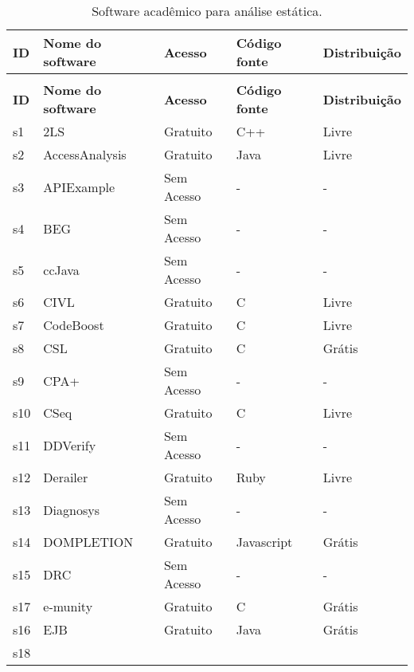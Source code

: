 \begin{longtable}{l l l l l}
\caption{Software acadêmico para análise estática.}
\label{software-table} \\
  \hhline{l l l l l |}
  \hline
  \endfirsthead
  \hhline{l l l l l |}
  \hline
  \textbf{ID} & \textbf{Nome do software} & \textbf{Acesso} & \textbf{Código fonte} & \textbf{Distribuição} \\
  \hline
  \hhline{l l l l l |}
  \endhead
  \hhline{-----}
  \multicolumn{5}{c}{continua na próxima página} \\
  \hhline{-----} \endfoot
  \endlastfoot
  \textbf{ID} & \textbf{Nome do software} & \textbf{Acesso} & \textbf{Código fonte} & \textbf{Distribuição} \\
  \hline
    s1 &
      2LS &
      Gratuito &
      C++ &
      Livre \\
    s2 &
      AccessAnalysis &
      Gratuito &
      Java &
      Livre \\
    s3 &
      APIExample &
      Sem Acesso &
      - &
      - \\
    s4 &
      BEG &
      Sem Acesso &
      - &
      - \\
    s5 &
      ccJava &
      Sem Acesso &
      - &
      - \\
    s6 &
      CIVL &
      Gratuito &
      C &
      Livre \\
    s7 &
      CodeBoost &
      Gratuito &
      C &
      Livre \\
    s8 &
      CSL &
      Gratuito &
      C &
      Grátis \\
    s9 &
      CPA+ &
      Sem Acesso &
      - &
      - \\
    s10 &
      CSeq &
      Gratuito &
      C &
      Livre \\
    s11 &
      DDVerify &
      Sem Acesso &
      - &
      - \\
    s12 &
      Derailer &
      Gratuito &
      Ruby &
      Livre \\
    s13 &
      Diagnosys &
      Sem Acesso &
      - &
      - \\
    s14 &
      DOMPLETION &
      Gratuito &
      Javascript &
      Grátis \\
    s15 &
      DRC &
      Sem Acesso &
      - &
      - \\
    s17 &
      e-munity &
      Gratuito &
      C &
      Grátis \\
    s16 &
      EJB &
      Gratuito &
      Java &
      Grátis \\
    s18 &

\end{longtable}
